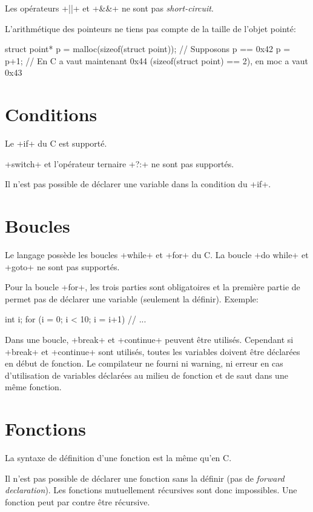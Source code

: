 \documentclass[a4paper]{article}
\begin{document}
    Les opérateurs \imoc+||+ et \imoc+&&+ ne sont pas \emph{short-circuit}.

    L'arithmétique des pointeurs ne tiens pas compte de la taille de l'objet
    pointé:
    \begin{moc}
struct point* p = malloc(sizeof(struct point));
// Supposons p == 0x42
p = p+1;
// En C a vaut maintenant 0x44 (sizeof(struct point) == 2), en moc a vaut 0x43
    \end{moc}

  \section{Conditions}
    Le \imoc+if+ du C est supporté.

    \imoc+switch+ et l'opérateur ternaire \imoc+?:+ ne sont pas supportés.

    Il n'est pas possible de déclarer une variable dans la condition du
    \imoc+if+.

  \section{Boucles}
    Le langage possède les boucles \imoc+while+ et \imoc+for+ du C. La boucle
    \imoc+do {} while+ et \imoc+goto+ ne sont pas supportés.

    Pour la boucle \imoc+for+, les trois parties sont obligatoires et la
    première partie de permet pas de déclarer une variable (seulement la
    définir). Exemple:

    \begin{moc}
int i;
for (i = 0; i < 10; i = i+1) {
    // ...
}
    \end{moc}

    Dans une boucle, \imoc+break+ et \imoc+continue+ peuvent être utilisés.
    Cependant si \imoc+break+ et \imoc+continue+ sont utilisés, toutes les
    variables doivent être déclarées en début de fonction. Le compilateur ne
    fourni ni warning, ni erreur en cas d'utilisation de variables déclarées au
    milieu de fonction et de saut dans une même fonction.

  \section{Fonctions}
    La syntaxe de définition d'une fonction est la même qu'en C.

    Il n'est pas possible de déclarer une fonction sans la définir (pas de
    \emph{forward declaration}). Les fonctions mutuellement récursives sont donc
    impossibles. Une fonction peut par contre être récursive.
\end{document}
